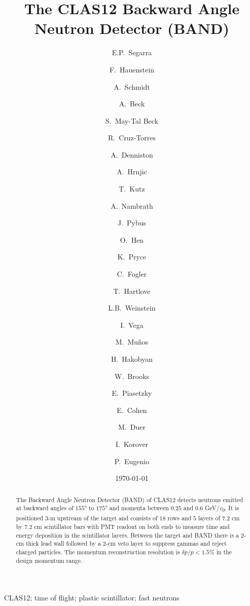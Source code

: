 \documentclass[3p,final,twocolumn]{elsarticle}
\newcommand*{\MIT }{Massachusetts Institute of Technology, Cambridge, Massachusetts 02139, USA}
\newcommand*{\ODU}{Old Dominion University, Norfolk, Virginia 23529, USA}
\newcommand*{\TAU }{School of Physics and Astronomy, Tel Aviv University, Tel Aviv 69978, Israel}
\newcommand*{\NRC}{Nuclear Research Center Negev, Be'er Sheva 84190, Israel}
\newcommand*{\FSU}{Florida State University, Tallahassee, Florida 32306, USA}
\newcommand*{\UTFSM}{Universidad T\'{e}cnica Federico Santa Mar\'{i}a, Casilla 110-V Valpara\'{i}so, Chile}
\begin{document}
\begin{frontmatter}

\title{The CLAS12 Backward Angle Neutron Detector (BAND) }



\author{E.P.~Segarra}
\author{F.~Hauenstein}

\author{A.~Schmidt}
\author{A.~Beck}
\author{S.~May-Tal Beck}
\author{R.~Cruz-Torres}
\author{A.~Denniston}
\author{A.~Hrnjic}
\author{T.~Kutz}
\author{A.~Nambrath}
\author{J.~Pybus }
\author{O.~Hen}
\address{\MIT}

\author{K.~Pryce}
\author{C.~Fogler}
\author{T.~Hartlove}
\author{L.B.~Weinstein}
\address{\ODU}
\author{I.~Vega}
\author{M.~Mu\~nos}
\author{H.~Hakobyan}
\author{W.~Brooks}
\address{\UTFSM}
\author{E.~Piasetzky}
\author{E.~Cohen}
\author{M.~Duer}
\address{\TAU}
\author{I.~Korover}
\address{\NRC}
\author{P.~Eugenio}
\address{\FSU}

\date{\today}
\begin{abstract}
 The Backward Angle Neutron Detector (BAND) of CLAS12 detects neutrons
  emitted at backward angles of $155$\si{\degree} to $175$\si{\degree}
  and momenta between $0.25$ and $0.6$ \si{\GeV/\clight}. It is
  positioned 3-\si{\meter} upstream of the target and consists of $18$
  rows and $5$ layers of $7.2$ \si{\centi\meter} by $7.2$
  \si{\centi\meter} scintillator bars with PMT readout on both ends to
  measure time and energy deposition in the scintillator
  layers. Between the target and BAND there is a 2-\si{\centi\meter}
  thick lead wall followed by a 2-\si{\centi\meter} veto layer to
  suppress gammas and reject charged particles. The momentum
  reconstruction resolution is $\delta p/p < 1.5$\% in the design
  momentum range.
\end{abstract}

\begin{keyword}
CLAS12; time of flight; plastic scintillator; fast neutrons
\end{keyword}
\end{frontmatter}
\end{document}
